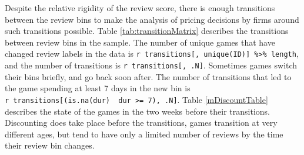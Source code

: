 \documentclass[
  12pt,
  pagebackref]{article}
\begin{document}
Despite the relative rigidity of the review score, there is enough
transitions between the review bins to make the analysis of pricing
decisions by firms around such transitions possible. Table
\ref{tab:transitionMatrix} describes the transitions between review bins
in the sample. The number of unique games that have changed review
labels in the data is
\texttt{r\ transitions{[},\ unique(ID){]}\ \%\textgreater{}\%\ length},
and the number of transitions is \texttt{r\ transitions{[},\ .N{]}}.
Sometimes games switch their bins briefly, and go back soon after. The
number of transitions that led to the game spending at least 7 days in
the new bin is
\texttt{r\ transitions{[}(is.na(dur)\ \textbar{}\ dur\ \textgreater{}=\ 7),\ .N{]}}.
Table \ref{mDiscountTable} describes the state of the games in the two
weeks before their transitions. Discounting does take place before the
transitions, games transition at very different ages, but tend to have
only a limited number of reviews by the time their review bin changes.

\begin{table}

\caption{\label{tab:transitionMatrix}Transition Probability And Count Matrices}
\centering
{}
\end{table}
\end{document}
